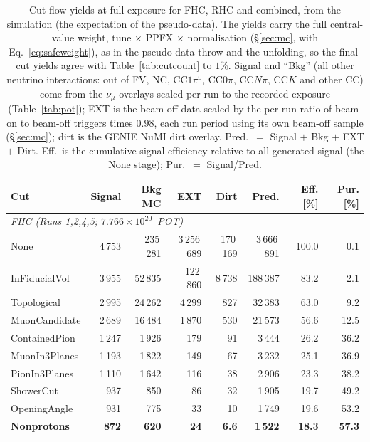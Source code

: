 \documentclass[11pt,a4paper]{article}
\begin{document}
\begin{table}[H]
  \centering
  \caption{Cut-flow yields at full exposure for FHC, RHC and combined, from the simulation (the
    expectation of the pseudo-data). The yields carry the full central-value weight, tune $\times$ PPFX
    $\times$ normalisation (\S\ref{sec:mc}, with Eq.~\eqref{eq:safeweight}), as in the pseudo-data throw
    and the unfolding, so the final-cut yields agree with Table~\ref{tab:cutcount} to $1\%$. Signal and
    ``Bkg'' (all other neutrino interactions: out of FV, NC, CC$1\pi^0$, CC$0\pi$, CC$N\pi$, CC$K$ and
    other CC) come from the $\nu_\mu$ overlays scaled per run to the recorded exposure
    (Table~\ref{tab:pot}); EXT is the beam-off data scaled by the per-run ratio of beam-on to beam-off
    triggers times $0.98$, each run period using its own beam-off sample (\S\ref{sec:mc}); dirt is the
    GENIE NuMI dirt overlay. Pred.\ $=$ Signal $+$ Bkg $+$ EXT $+$ Dirt. Eff.\ is the cumulative signal
    efficiency relative to all generated signal (the None stage); Pur.\ $=$ Signal/Pred.}
  \label{tab:cutflow}
  \small
  \begin{tabular}{lrrrrrrr}
    \toprule
    Cut & Signal & Bkg MC & EXT & Dirt & Pred. & Eff. [\%] & Pur. [\%] \\
    \midrule
    \multicolumn{8}{l}{\textit{FHC (Runs 1,2,4,5; $7.766\times10^{20}$~POT)}} \\
    None & 4\,753 & 235\,281 & 3\,256\,689 & 170\,169 & 3\,666\,891 & 100.0 & 0.1 \\
    InFiducialVol & 3\,955 & 52\,835 & 122\,860 & 8\,738 & 188\,387 & 83.2 & 2.1 \\
    Topological & 2\,995 & 24\,262 & 4\,299 & 827 & 32\,383 & 63.0 & 9.2 \\
    MuonCandidate & 2\,689 & 16\,484 & 1\,870 & 530 & 21\,573 & 56.6 & 12.5 \\
    ContainedPion & 1\,247 & 1\,926 & 179 & 91 & 3\,444 & 26.2 & 36.2 \\
    MuonIn3Planes & 1\,193 & 1\,822 & 149 & 67 & 3\,232 & 25.1 & 36.9 \\
    PionIn3Planes & 1\,110 & 1\,642 & 116 & 38 & 2\,906 & 23.3 & 38.2 \\
    ShowerCut & 937 & 850 & 86 & 32 & 1\,905 & 19.7 & 49.2 \\
    OpeningAngle & 931 & 775 & 33 & 10 & 1\,749 & 19.6 & 53.2 \\
    \textbf{Nonprotons} & \textbf{872} & \textbf{620} & \textbf{24} & \textbf{6.6} & \textbf{1\,522} & \textbf{18.3} & \textbf{57.3} \\

\end{tabular}
\end{table}
\end{document}

